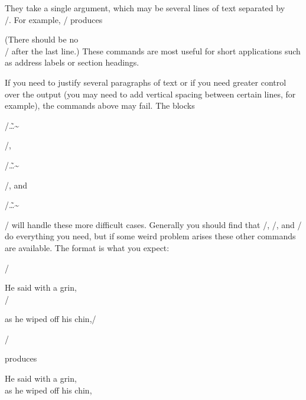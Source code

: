 \begin{(|it
name|/)}
\begin{(|it
name|/)}

\noindent They take a single argument, which may be several lines of text
separated by \tts\\/.  For example, \tts{}/ produces

\nobreak\smallskip


\smallskip

\noindent (There should be no \tts\\/ after the last line.)  These commands are
most useful for short applications such as address labels or section headings.

If you need to justify several paragraphs of text or if you need greater
control over the output (you may need to add vertical spacing between certain
lines, for example), the commands above may fail.  The blocks
\tts\begin{left}/\~\dots\~\tts\end{left}/,
\tts\begin{right}/\~\dots\~\tts\end{right}/, and
\tts\begin{center}/\~\dots\~\tts\end{center}/ will handle these more difficult
cases.  Generally you should find that \tts\lefttext/, \tts\righttext/, and\/
\tts\centertext/ do everything you need, but if some weird problem arises these
other commands are available.  The format is what you expect:

\nobreak\smallskip

\tts\begin{center}/ \par
\tts He said with a grin,\\/ \par
\tts as he wiped off his chin,/ \par
\tts\end{center}/ \par

\nobreak\smallskip

\noindent produces

\smallskip

\begin{center}
He said with a grin,\\
as he wiped off his chin,
\end{center}


\end{(|it
name|/)}
\end{(|it
name|/)}
